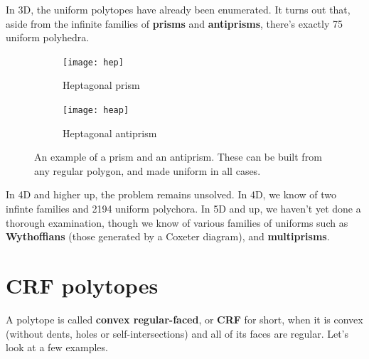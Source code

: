 \documentclass{article}
\begin{document}
In 3D, the uniform polytopes have already been enumerated. It turns out that, aside from the infinite families of \textbf{prisms} and \textbf{antiprisms}, there's exactly 75 uniform polyhedra.

\begin{figure}[H]
  \centering
  \begin{subfigure}{.5\textwidth}
    \centering
    \texttt{[image: hep]}
    \caption{Heptagonal prism}
    \label{fig:hep}
  \end{subfigure}%
  \begin{subfigure}{.5\textwidth}
    \centering
    \texttt{[image: heap]}
    \caption{Heptagonal antiprism}
    \label{fig:heap}
  \end{subfigure}%
  \caption{An example of a prism and an antiprism. These can be built from any regular polygon, and made uniform in all cases.}
  \label{fig:prisms}
\end{figure}

In 4D and higher up, the problem remains unsolved. In 4D, we know of two infinte families and 2194 uniform polychora. In 5D and up, we haven't yet done a thorough examination, though we know of various families of uniforms such as \textbf{Wythoffians} (those generated by a Coxeter diagram), and \textbf{multiprisms}.

\section{CRF polytopes}
A polytope is called \textbf{convex regular-faced}, or \textbf{CRF} for short, when it is convex (without dents, holes or self-intersections) and all of its faces are regular. Let's look at a few examples.
\end{document}
